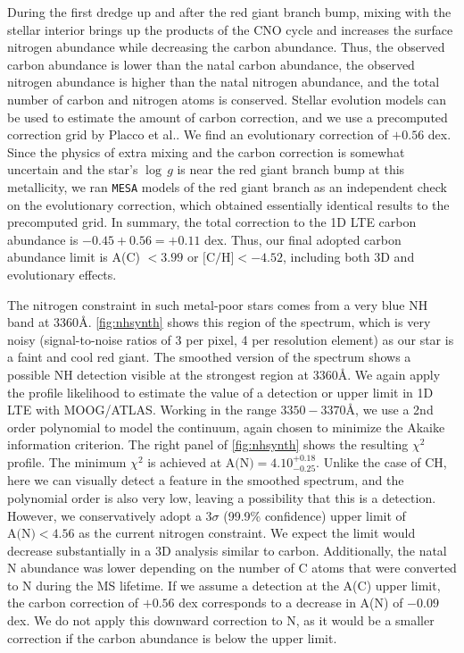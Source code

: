 \documentclass{natureprintstyle}
\newcommand{\code}[1]{\texttt{#1}\xspace}
\newcommand{\logg}{\ensuremath{\log\,g}\xspace}
\begin{document}
During the first dredge up and after the red giant branch bump, mixing with the stellar interior brings up the products of the CNO cycle and increases the surface nitrogen abundance while decreasing the carbon abundance\cite{Gratton2000}.
Thus, the observed carbon abundance is lower than the natal carbon abundance, the observed nitrogen abundance is higher than the natal nitrogen abundance, and the total number of carbon and nitrogen atoms is conserved.
Stellar evolution models can be used to estimate the amount of carbon correction, and we use a precomputed correction grid by Placco et al.\cite{Placco2014}.
We find an evolutionary correction of $+0.56$ dex.
Since the physics of extra mixing and the carbon correction is somewhat uncertain and the star's \logg is near the red giant branch bump at this metallicity\cite{Fraser2022,Tayar2022}, we ran \code{MESA} models of the red giant branch as an independent check on the evolutionary correction, which obtained essentially identical results to the precomputed grid.
In summary, the total correction to the 1D LTE carbon abundance is $-0.45+0.56 = +0.11$ dex.
Thus, our final adopted carbon abundance limit is A(C) $< 3.99$ or $\mbox{[C/H]} < -4.52$, including both 3D and evolutionary effects.

The nitrogen constraint in such metal-poor stars comes from a very blue NH band at 3360{\AA}.
\ref{fig:nhsynth} shows this region of the spectrum, which is very noisy (signal-to-noise ratios of 3 per pixel, 4 per resolution element) as our star is a faint and cool red giant.
The smoothed version of the spectrum shows a possible NH detection visible at the strongest region at 3360{\AA}.
We again apply the profile likelihood to estimate the value of a detection or upper limit in 1D LTE with MOOG/ATLAS.
Working in the range $3350-3370${\AA}, we use a 2nd order polynomial to model the continuum, again chosen to minimize the Akaike information criterion.
The right panel of \ref{fig:nhsynth} shows the resulting $\chi^2$ profile. The minimum $\chi^2$ is achieved at $\mbox{A(N)} = 4.10^{+0.18}_{-0.25}$.
Unlike the case of CH, here we can visually detect a feature in the smoothed spectrum, and the polynomial order is also very low, leaving a possibility that this is a detection.
However, we conservatively adopt a $3\sigma$ (99.9\% confidence) upper limit of $\mbox{A(N)} < 4.56$ as the current nitrogen constraint. We expect the limit would decrease substantially in a 3D analysis similar to carbon. Additionally, the natal N abundance was lower depending on the number of C atoms that were converted to N during the MS lifetime. If we assume a detection at the A(C) upper limit, the carbon correction of $+0.56$ dex corresponds to a decrease in A(N) of $-0.09$ dex. We do not apply this downward correction to N, as it would be a smaller correction if the carbon abundance is below the upper limit.
\end{document}
